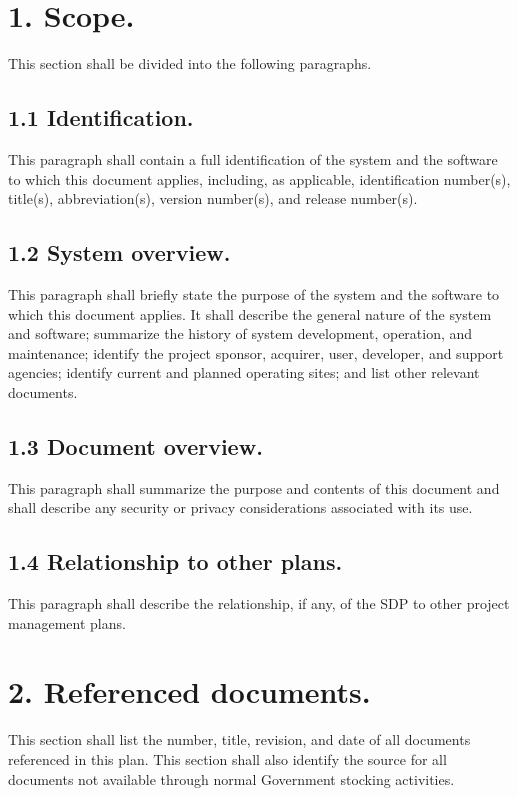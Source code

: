 \section{1. Scope.}

This section shall be divided into the following paragraphs.

\subsection{1.1 Identification.}

This paragraph shall contain a full identification of the system and the
software to which this document applies, including, as applicable,
identification number(s), title(s), abbreviation(s), version number(s),
and release number(s).

\subsection{1.2 System overview.}

This paragraph shall briefly state the purpose of the system and the
software to which this document applies. It shall describe the general
nature of the system and software; summarize the history of system
development, operation, and maintenance; identify the project sponsor,
acquirer, user, developer, and support agencies; identify current and
planned operating sites; and list other relevant documents.

\subsection{1.3 Document overview.}

This paragraph shall summarize the purpose and contents of this document
and shall describe any security or privacy considerations associated
with its use.

\subsection{1.4 Relationship to other plans.}

This paragraph shall describe the relationship, if any, of the SDP to
other project management plans.

\section{2. Referenced documents.}

This section shall list the number, title, revision, and date of all
documents referenced in this plan. This section shall also identify the
source for all documents not available through normal Government
stocking activities.

